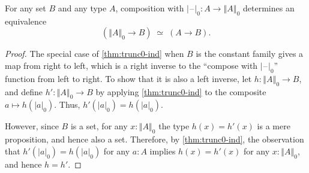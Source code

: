 \documentclass[10pt,a4paper]{article}
\providecommand{\index}[1]{}
\newcommand{\eqvspaced}[2]{\ensuremath{#1 \;\simeq\; #2}\xspace}
\newcommand{\trunc}[2]{\mathopen{}\left\Vert #2\right\Vert_{#1}\mathclose{}}
\newcommand{\tproj}[3][]{\mathopen{}\left|#3\right|_{#2}^{#1}\mathclose{}}
\newcommand{\tprojf}[2][]{|\blank|_{#2}^{#1}}
\newcommand{\blank}{\mathord{\hspace{1pt}\text{--}\hspace{1pt}}}
\theoremstyle{definition}
\theoremstyle{remark}
\numberwithin{equation}{section}
\begin{document}
\begin{lem}\label{thm:trunc0-lump}
  \index{universal!property!of truncation}%
  For any set $B$ and any type $A$, composition with $\tprojf0:A\to \trunc0A$ determines an equivalence
  \[ \eqvspaced{(\trunc0A\to B)}{(A\to B)}. \]
\end{lem}

\begin{proof}
  The special case of \cref{thm:trunc0-ind} when $B$ is the constant family gives a map from right to left, which is a right inverse to the ``compose with $\tprojf0$'' function from left to right.
  To show that it is also a left inverse, let $h:\trunc0A\to B$, and define $h':\trunc0A\to B$ by applying \cref{thm:trunc0-ind} to the composite $a\mapsto h(\tproj0a)$.
  Thus, $h'(\tproj0a)=h(\tproj0a)$.

  However, since $B$ is a set, for any $x:\trunc0A$ the type $h(x)=h'(x)$ is a mere proposition, and hence also a set.
  Therefore, by \cref{thm:trunc0-ind}, the observation that $h'(\tproj0a)=h(\tproj0a)$ for any $a:A$ implies $h(x)=h'(x)$ for any $x:\trunc0A$, and hence $h=h'$.
\end{proof}
\end{document}
